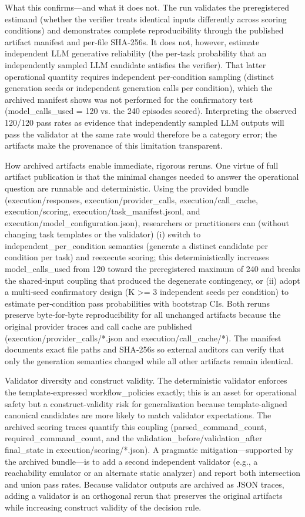\documentclass[conference]{IEEEtran}
\begin{document}
What this confirms---and what it does not. The run validates the preregistered estimand (whether the verifier treats identical inputs differently across scoring conditions) and demonstrates complete reproducibility through the published artifact manifest and per‑file SHA‑256s. It does not, however, estimate independent LLM generative reliability (the per‑task probability that an independently sampled LLM candidate satisfies the verifier). That latter operational quantity requires independent per‑condition sampling (distinct generation seeds or independent generation calls per condition), which the archived manifest shows was not performed for the confirmatory test (model\_calls\_used = 120 vs. the 240 episodes scored). Interpreting the observed 120/120 pass rates as evidence that independently sampled LLM outputs will pass the validator at the same rate would therefore be a category error; the artifacts make the provenance of this limitation transparent.

How archived artifacts enable immediate, rigorous reruns. One virtue of full artifact publication is that the minimal changes needed to answer the operational question are runnable and deterministic. Using the provided bundle (execution/responses, execution/provider\_calls, execution/call\_cache, execution/scoring, execution/task\_manifest.jsonl, and execution/model\_configuration.json), researchers or practitioners can (without changing task templates or the validator) (i) switch to independent\_per\_condition semantics (generate a distinct candidate per condition per task) and reexecute scoring; this deterministically increases model\_calls\_used from 120 toward the preregistered maximum of 240 and breaks the shared‑input coupling that produced the degenerate contingency, or (ii) adopt a multi‑seed confirmatory design (K >= 3 independent seeds per condition) to estimate per‑condition pass probabilities with bootstrap CIs. Both reruns preserve byte‑for‑byte reproducibility for all unchanged artifacts because the original provider traces and call cache are published (execution/provider\_calls/*.json and execution/call\_cache/*). The manifest documents exact file paths and SHA‑256s so external auditors can verify that only the generation semantics changed while all other artifacts remain identical.

Validator diversity and construct validity. The deterministic validator enforces the template‑expressed workflow\_policies exactly; this is an asset for operational safety but a construct‑validity risk for generalization because template‑aligned canonical candidates are more likely to match validator expectations. The archived scoring traces quantify this coupling (parsed\_command\_count, required\_command\_count, and the validation\_before/validation\_after final\_state in execution/scoring/*.json). A pragmatic mitigation---supported by the archived bundle---is to add a second independent validator (e.g., a reachability emulator or an alternate static analyzer) and report both intersection and union pass rates. Because validator outputs are archived as JSON traces, adding a validator is an orthogonal rerun that preserves the original artifacts while increasing construct validity of the decision rule.
\end{document}
